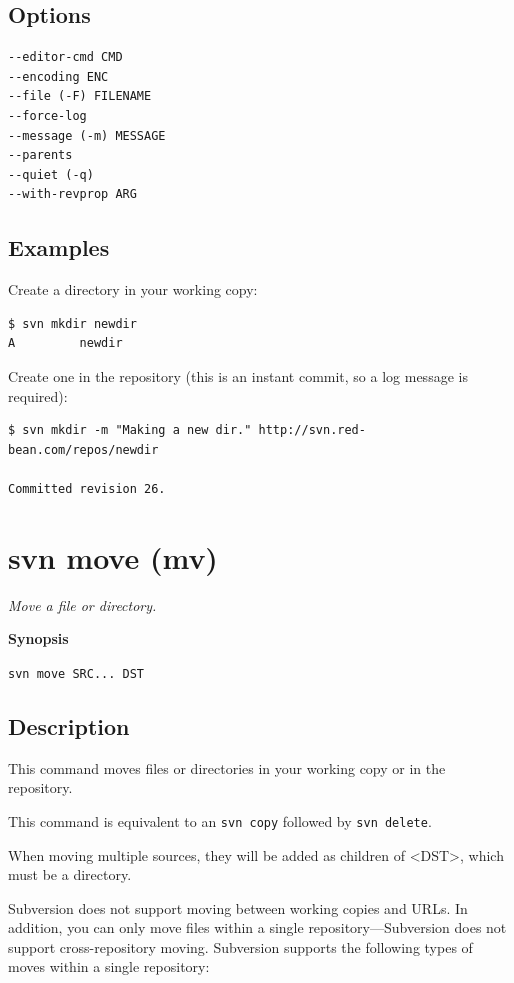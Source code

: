 \subsection{Options}

\begin{verbatim}
--editor-cmd CMD
--encoding ENC
--file (-F) FILENAME
--force-log
--message (-m) MESSAGE
--parents
--quiet (-q)
--with-revprop ARG
\end{verbatim}

\subsection{Examples}

Create a directory in your working copy:

\begin{verbatim}
$ svn mkdir newdir
A         newdir
\end{verbatim}

Create one in the repository (this is an instant commit, so a log
message is required):

\begin{verbatim}
$ svn mkdir -m "Making a new dir." http://svn.red-bean.com/repos/newdir

Committed revision 26.
\end{verbatim}

\section{svn move (mv)}\label{svn.ref.svn.c.move}

\emph{Move a file or directory.}

\textbf{Synopsis}

\texttt{svn\ move\ SRC...\ DST}

\subsection{Description}

This command moves files or directories in your working copy or in the
repository.

This command is equivalent to an \texttt{svn\ copy} followed by
\texttt{svn\ delete}.

When moving multiple sources, they will be added as children of
\textless DST\textgreater, which must be a directory.

Subversion does not support moving between working copies and URLs. In
addition, you can only move files within a single
repository---Subversion does not support cross-repository moving.
Subversion supports the following types of moves within a single
repository:

